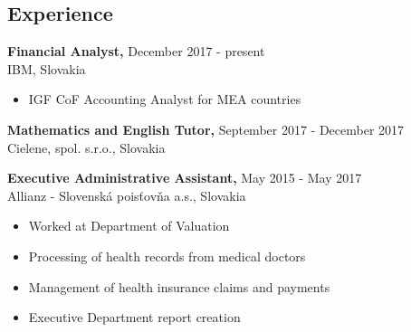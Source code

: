 \documentclass[margin]{res}
\begin{document}

\address{{\bf Permanent Address} \\ Dobrianskeho 1597/49 \\ 093 01 Vranov nad Top\v{l}ou \\ Slovakia \\
        +421 908 274 464 \\ zuzana@kosalko.sk \\ linkedin.com/in/zuzana-kosalkova}

\address{}


\begin{resume}


\section{Experience}

{\bf Financial Analyst,} \hfill December 2017 - present \\
IBM, Slovakia
\begin{itemize} \itemsep -2pt %
\item IGF CoF Accounting Analyst for MEA countries
\end{itemize}

{\bf Mathematics and English Tutor,} \hfill September 2017 - December 2017 \\
Cielene, spol. s.r.o., Slovakia

{\bf Executive Administrative Assistant,} \hfill May 2015 - May 2017 \\
Allianz - Slovensk\'{a} pois\v{t}ov\v{n}a a.s., Slovakia
\begin{itemize} \itemsep -2pt %
\item Worked at Department of Valuation
\item Processing of health records from medical doctors
\item Management of health insurance claims and payments
\item Executive Department report creation
\end{itemize}


\end{resume}
\end{document}
